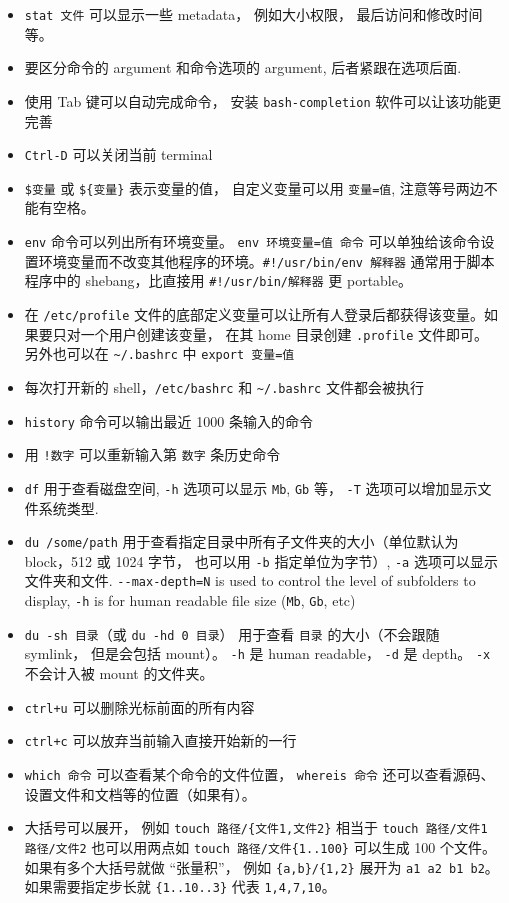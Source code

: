 \begin{itemize}
\item \verb`stat 文件` 可以显示一些 metadata， 例如大小权限， 最后访问和修改时间等。
\item 要区分命令的 argument 和命令选项的 argument, 后者紧跟在选项后面.
\item 使用 Tab 键可以自动完成命令， 安装 \verb`bash-completion` 软件可以让该功能更完善
\item \verb`Ctrl-D` 可以关闭当前 terminal
\item \verb`$变量` 或 \verb`${变量}` 表示变量的值， 自定义变量可以用 \verb`变量=值`, 注意等号两边不能有空格。
\item \verb`env` 命令可以列出所有环境变量。 \verb`env 环境变量=值 命令` 可以单独给该命令设置环境变量而不改变其他程序的环境。\verb`#!/usr/bin/env 解释器` 通常用于脚本程序中的 shebang，比直接用 \verb`#!/usr/bin/解释器` 更 portable。
\item 在 \verb`/etc/profile` 文件的底部定义变量可以让所有人登录后都获得该变量。如果要只对一个用户创建该变量， 在其 home 目录创建 \verb`.profile` 文件即可。 另外也可以在 \verb`~/.bashrc` 中 \verb`export 变量=值`
\item 每次打开新的 shell，\verb`/etc/bashrc` 和 \verb`~/.bashrc` 文件都会被执行
\item \verb`history` 命令可以输出最近 1000 条输入的命令
\item 用 \verb`!数字` 可以重新输入第 \verb`数字` 条历史命令
\item \verb`df` 用于查看磁盘空间, \verb`-h` 选项可以显示 \verb`Mb`, \verb`Gb` 等， \verb`-T` 选项可以增加显示文件系统类型.
\item \verb`du /some/path` 用于查看指定目录中所有子文件夹的大小（单位默认为 block，512 或 1024 字节， 也可以用 \verb`-b` 指定单位为字节）, \verb`-a` 选项可以显示文件夹和文件. \verb`--max-depth=N` is used to control the level of subfolders to display, \verb`-h` is for human readable file size (\verb`Mb`, \verb`Gb`, etc)
\item \verb`du -sh 目录`（或 \verb`du -hd 0 目录`） 用于查看 \verb`目录` 的大小（不会跟随 symlink， 但是会包括 mount）。 \verb`-h` 是 human readable， \verb`-d` 是 depth。 \verb`-x` 不会计入被 mount 的文件夹。
\item \verb`ctrl+u` 可以删除光标前面的所有内容
\item \verb`ctrl+c` 可以放弃当前输入直接开始新的一行
\item \verb`which 命令` 可以查看某个命令的文件位置， \verb`whereis 命令` 还可以查看源码、设置文件和文档等的位置（如果有）。
\item 大括号可以展开， 例如 \verb`touch 路径/{文件1,文件2}` 相当于 \verb`touch 路径/文件1 路径/文件2` 也可以用两点如 \verb`touch 路径/文件{1..100}` 可以生成 100 个文件。 如果有多个大括号就做 “张量积”， 例如 \verb`{a,b}/{1,2}` 展开为 \verb`a1 a2 b1 b2`。 如果需要指定步长就 \verb`{1..10..3}` 代表 \verb`1,4,7,10`。
\end{itemize}

